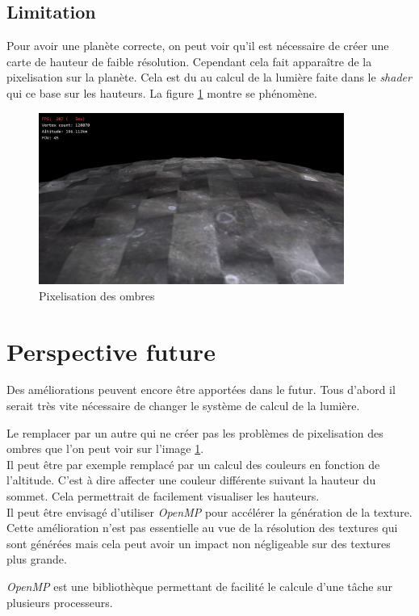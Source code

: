 \subsection{Limitation}

Pour avoir une planète correcte, on peut voir qu'il est nécessaire de créer une carte de hauteur de faible résolution. Cependant cela fait apparaître de la pixelisation sur la planète. Cela est du au calcul de la lumière faite dans le \textit{shader} qui ce base sur les hauteurs. La figure \ref{fig:px_ombre} montre se phénomène. \\



\begin{figure}
    \centering
    \includegraphics[width=10cm]{img/SIMPLEX_w200_h200_0.png}
    \caption{Pixelisation des ombres}
    \label{fig:px_ombre}
\end{figure}


\section{Perspective future}

Des améliorations peuvent encore être apportées dans le futur.
Tous d'abord il serait très vite nécessaire de changer le système de calcul de la lumière. 

Le remplacer par un autre qui ne créer pas les problèmes de pixelisation des ombres que l'on peut voir sur l'image \ref{fig:px_ombre}.\\

Il peut être par exemple remplacé par un calcul des couleurs en fonction de l'altitude. C'est à dire affecter une couleur différente suivant la hauteur du sommet. Cela permettrait de facilement visualiser les hauteurs.\\

Il peut être envisagé d'utiliser \textit{OpenMP} pour accélérer la génération de la texture. Cette amélioration n'est pas essentielle au vue de la résolution des textures qui sont générées mais cela peut avoir un impact non négligeable sur des textures plus grande.

\textit{OpenMP} est une bibliothèque permettant de facilité le calcule d'une tâche sur plusieurs processeurs.

